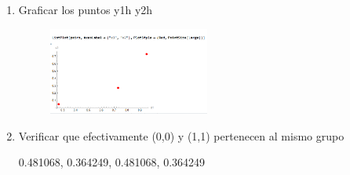 \documentclass{article}
\begin{document}
\begin{flushleft}
\begin{enumerate}
  \item Graficar los puntos y1h y2h
  \begin{figure}[H]
    \centering
    \includegraphics[width=0.5\textwidth]{4_h.PNG}  %
  \end{figure}

  \item Verificar que efectivamente (0,0) y (1,1) pertenecen al mismo grupo
  
  0.481068, 0.364249, 0.481068, 0.364249
  
  \end{enumerate}
\end{flushleft}
\end{document}
